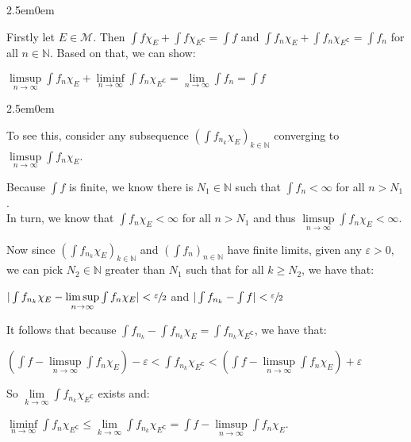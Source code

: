 \documentclass{book}
\newcommand{\exTwoP}{%
   \color{RedViolet}%
   \fontsize{13}{15}\selectfont%
}
\newcommand{\exPPP}{%
   \color{VioletRed}%
   \fontsize{12}{14}\selectfont%
}
\newenvironment{myIndent}{%
   \begin{adjustwidth}{2.5em}{0em}%
}{%
   \end{adjustwidth}%
}
\newcommand{\comp}{\mathsf{C}}
\newcommand{\retTwo}{\hfill\bigbreak}
\begin{document}
\begin{myIndent}\exTwoP
   Firstly let $E \in \mathcal{M}$. Then $\int f\chi_E + \int f \chi_{E^\comp} = \int f$ and $\int f_n\chi_E + \int f_n\chi_{E^\comp} = \int f_n$ for all $n \in \mathbb{N}$. Based on that, we can show:

   {\centering $\limsup\limits_{n \rightarrow \infty} \int f_n\chi_E + \liminf\limits_{n \rightarrow \infty} \int f_n\chi_{E^\comp} = \lim\limits_{n \rightarrow \infty} \int f_n = \int f$ \retTwo\par}

   \begin{myIndent}\exPPP
      To see this, consider any subsequence $(\int f_{n_k}\chi_E)_{k \in \mathbb{N}}$ converging to $\limsup\limits_{n \rightarrow \infty} \int f_n\chi_E$.\retTwo

      Because $\int f$ is finite, we know there is $N_1 \in \mathbb{N}$ such that $\int f_n < \infty$ for all $n > N_1$.\\ In turn, we know that $\int f_n\chi_E < \infty$ for all $n > N_1$ and thus $\limsup\limits_{n \rightarrow \infty} \int f_n\chi_E < \infty$.\retTwo

      Now since $(\int f_{n_k}\chi_E)_{k \in \mathbb{N}}$ and $(\int f_n)_{n \in \mathbb{N}}$ have finite limits, given any $\varepsilon > 0$, we can pick $N_2 \in \mathbb{N}$ greater than $N_1$ such that for all $k \geq N_2$, we have that:

      {\centering $|\int f_{n_k}\chi_E - \limsup\limits_{n \rightarrow \infty} \int f_n\chi_E| < \sfrac{\varepsilon}{2}$ and $|\int f_{n_k} - \int f| < \sfrac{\varepsilon}{2}$ \retTwo\par}

      It follows that because $\int f_{n_k} - \int f_{n_k}\chi_E = \int f_{n_k}\chi_{E^\comp}$, we have that:\\ [-10pt]

      {\centering $(\int f - \limsup\limits_{n \rightarrow \infty} \int f_n\chi_E) - \varepsilon < \int f_{n_k}\chi_{E^\comp} < (\int f - \limsup\limits_{n \rightarrow \infty} \int f_n\chi_E) + \varepsilon$ \retTwo\par}

      So $\lim\limits_{k \rightarrow \infty} \int f_{n_k}\chi_{E^\comp}$ exists and:

      {\centering $\liminf\limits_{n \rightarrow \infty} \int f_n\chi_{E^\comp} \leq \lim\limits_{k \rightarrow \infty} \int f_{n_k}\chi_{E^\comp} = \int f - \limsup\limits_{n \rightarrow \infty} \int f_n\chi_E$.\newpage\par}


\end{myIndent}
\end{myIndent}
\end{document}
